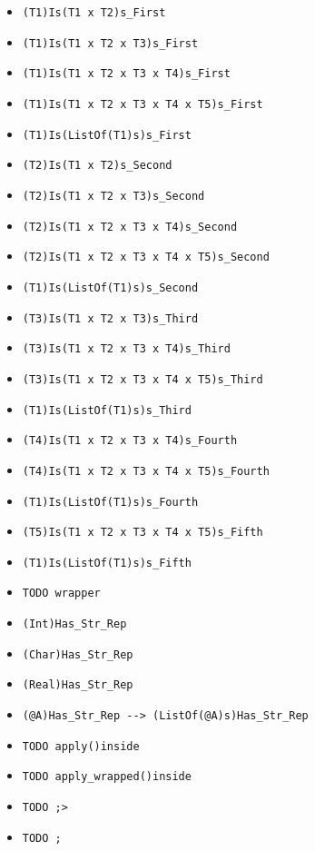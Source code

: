 \documentclass{article}
\begin{document}
\begin{itemize}
  \begin{itemize}
  \item \verb|(T1)Is(T1 x T2)s_First|
  \item \verb|(T1)Is(T1 x T2 x T3)s_First|
  \item \verb|(T1)Is(T1 x T2 x T3 x T4)s_First|
  \item \verb|(T1)Is(T1 x T2 x T3 x T4 x T5)s_First|
  \item \verb|(T1)Is(ListOf(T1)s)s_First|
  \item \verb|(T2)Is(T1 x T2)s_Second|
  \item \verb|(T2)Is(T1 x T2 x T3)s_Second|
  \item \verb|(T2)Is(T1 x T2 x T3 x T4)s_Second|
  \item \verb|(T2)Is(T1 x T2 x T3 x T4 x T5)s_Second|
  \item \verb|(T1)Is(ListOf(T1)s)s_Second|
  \item \verb|(T3)Is(T1 x T2 x T3)s_Third|
  \item \verb|(T3)Is(T1 x T2 x T3 x T4)s_Third|
  \item \verb|(T3)Is(T1 x T2 x T3 x T4 x T5)s_Third|
  \item \verb|(T1)Is(ListOf(T1)s)s_Third|
  \item \verb|(T4)Is(T1 x T2 x T3 x T4)s_Fourth|
  \item \verb|(T4)Is(T1 x T2 x T3 x T4 x T5)s_Fourth|
  \item \verb|(T1)Is(ListOf(T1)s)s_Fourth|
  \item \verb|(T5)Is(T1 x T2 x T3 x T4 x T5)s_Fifth|
  \item \verb|(T1)Is(ListOf(T1)s)s_Fifth|
  \item \verb|TODO wrapper|
  \item \verb|(Int)Has_Str_Rep|
  \item \verb|(Char)Has_Str_Rep|
  \item \verb|(Real)Has_Str_Rep|
  \item \verb|(@A)Has_Str_Rep --> (ListOf(@A)s)Has_Str_Rep|
  \item \verb|TODO apply()inside|
  \item \verb|TODO apply_wrapped()inside|
  \item \verb|TODO ;>|
  \item \verb|TODO ;|
  \end{itemize}

\end{itemize}

\newpage
\end{document}
